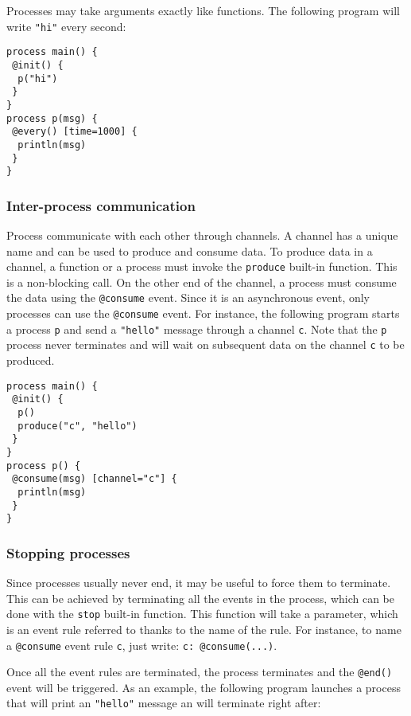 \documentclass[11pt]{article}
\begin{document}
Processes may take arguments exactly like functions. The following program will write \texttt{"hi"} every second:

\begin{lstlisting}
process main() {
 @init() {
  p("hi")
 }
}
process p(msg) {
 @every() [time=1000] {
  println(msg)
 }
}
\end{lstlisting}

\subsubsection{Inter-process communication\label{sec:communication}}

Process communicate with each other through channels. A channel has a unique name and can be used to produce and consume data. To produce data in a channel, a function or a process must invoke the \texttt{produce} built-in function. This is a non-blocking call. On the other end of the channel, a process must consume the data using the  \texttt{@consume} event. Since it is an asynchronous event, only processes can use the  \texttt{@consume} event. For instance, the following program starts a process \texttt{p} and send a \texttt{"hello"} message through a channel \texttt{c}. Note that the  \texttt{p} process never terminates and will wait on subsequent data on the channel \texttt{c} to be produced.

\begin{lstlisting}
process main() {
 @init() {
  p()
  produce("c", "hello")
 }
}
process p() {
 @consume(msg) [channel="c"] {
  println(msg)
 }
}
\end{lstlisting}

\subsubsection{Stopping processes}

Since processes usually never end, it may be useful to force them to terminate. This can be achieved by terminating all the events in the process, which can be done with the \texttt{stop} built-in function. This function will take a parameter, which is an event rule referred to thanks to the name of the rule. For instance, to name a \texttt{@consume} event rule \texttt{c}, just write: \texttt{c: @consume(...)}. 

Once all the event rules are terminated, the process terminates and the \texttt{@end()} event will be triggered. As an example, the following program launches a process that will print an \texttt{"hello"} message an will terminate right after:
\end{document}
